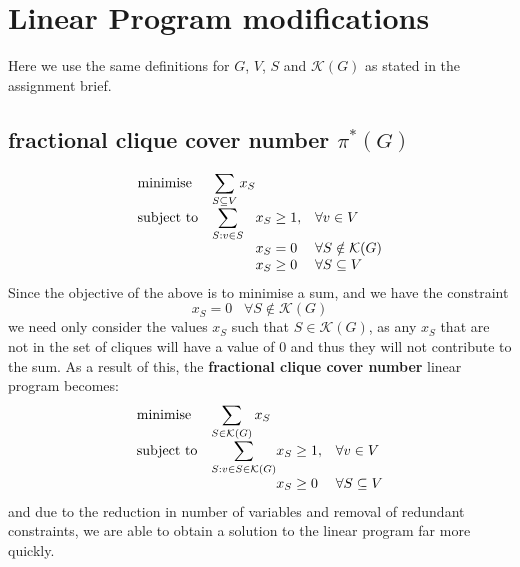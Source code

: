 \documentclass[12pt, a4paper]{article}
\begin{document}
\section*{Linear Program modifications}
Here we use the same definitions for $G$, $V$, $S$ and $\mathcal{K}(G)$ as stated in the assignment brief.
\subsection*{\textbf{fractional clique cover number} $\pi^*(G)$}
\begin{equation*}
\begin{array}{ll@{}ll}
\text{minimise}  & \displaystyle\sum\limits_{S \subseteq V} x_S &\\
\text{subject to}& \displaystyle\sum\limits_{S:v\in S}   &x_{S} \geq 1,  & \forall v \in V\\
                 &                                                &x_{S} = 0  & \forall S \notin \mathcal{K}(G)\\
                 &                                                &x_{S} \geq 0  & \forall S \subseteq V
\end{array}
\end{equation*}
Since the objective of the above is to minimise a sum, and we have the constraint  
\begin{equation*}
x_{S} = 0  \, \, \, \, \, \forall S \notin \mathcal{K}(G)
\end{equation*}
 we need only consider the values $x_{S}$ such that $S \in \mathcal{K}(G)$, as any $x_S$ that are not in the set of cliques will have a value of $0$ and thus they will not contribute to the sum. As a result of this, the \textbf{fractional clique cover number} linear program becomes:
 \begin{equation*}
\begin{array}{ll@{}ll}
\text{minimise}  & \displaystyle\sum\limits_{S \in \mathcal{K}(G)} x_S &\\
\text{subject to}& \displaystyle\sum\limits_{S:v\in S\in \mathcal{K}(G)}   &x_{S} \geq 1,  & \forall v \in V\\
                 &                                                &x_{S} \geq 0  & \forall S \subseteq V
\end{array}
\end{equation*}
and due to the reduction in number of variables and removal of redundant constraints, we are able to obtain a solution to the linear program far more quickly.
\end{document}
